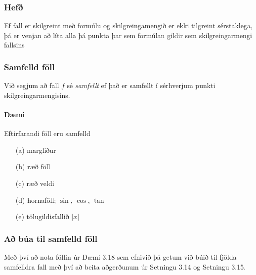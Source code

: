 \documentclass[icelandic,a4paper,12pt]{article}
\begin{document}
\subsubsection*{Hefð}
  Ef fall er skilgreint með formúlu og skilgreingamengið er ekki
tilgreint sérstaklega, þá er venjan að líta alla þá punkta þar
sem formúlan gildir sem skilgreingarmengi fallsins
 


\subsubsection*{Samfelld föll}
 Við segjum að fall $f$ sé \emph{samfellt} ef það er samfellt í sérhverjum
punkti skilgreingarmengisins.


\pause

\paragraph{Dæmi}
Eftirfarandi föll eru samfelld
\begin{itemize}
\pause
  \item[(a)] margliður
\pause
  \item[(b)] ræð föll
\pause
  \item[(c)] ræð veldi
\pause
  \item[(d)] hornaföll; $\sin$, $\cos$, $\tan$
\pause
  \item[(e)] tölugildisfallið $|x|$
\end{itemize}




\subsubsection*{Að búa til samfelld föll}
 Með því að nota föllin úr Dæmi 3.18 sem efnivið þá getum við búið til 
fjölda samfelldra fall með því að beita aðgerðunum úr Setningu 3.14 og 
Setningu 3.15.
 
\end{document}
